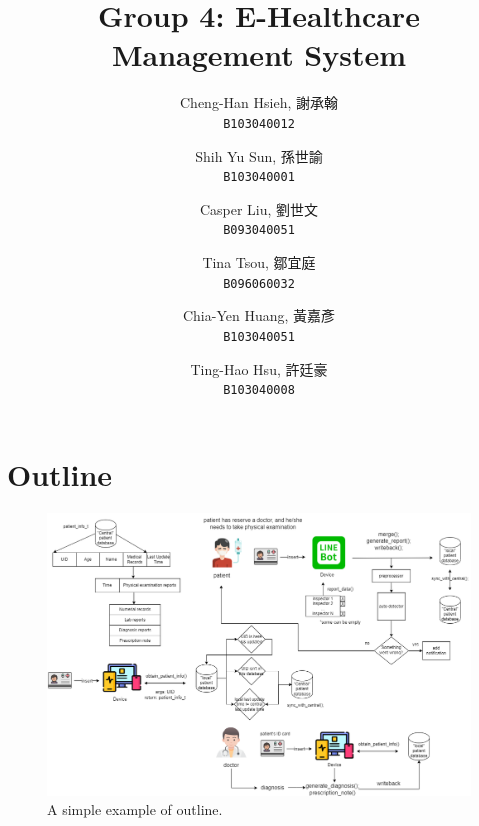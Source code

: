 \documentclass{article}
\begin{document}
\title{Group 4: E-Healthcare Management System}
\author{
  Cheng-Han Hsieh, 謝承翰\\
  \texttt{B103040012}
  \and
  Shih Yu Sun, 孫世諭\\
  \texttt{B103040001}
  \and
  Casper Liu, 劉世文\\
  \texttt{B093040051}
  \and
  Tina Tsou, 鄒宜庭\\
  \texttt{B096060032}
  \and
  Chia-Yen Huang, 黃嘉彥\\
  \texttt{B103040051}
  \and
  Ting-Hao Hsu, 許廷豪\\
  \texttt{B103040008}
}

\maketitle

\section{Outline}
\label{sec:outline}

  \begin{figure}[h]
    \centering
    \includegraphics[scale = 0.25]{asset/flowchart.png}
    \caption{A simple example of outline.}
    \label{fig:flowchart}
  \end{figure}
\end{document}
